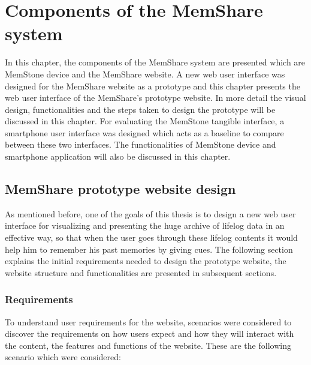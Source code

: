 \documentclass[mscthesis]{usiinfthesis}
\begin{document}
\chapter{Components of the MemShare system}
\label{sec:bot}
In this chapter, the components of the MemShare system are presented which are MemStone device and the MemShare website. A new web user interface was designed for the MemShare website as a prototype and this chapter presents the web user interface of the MemShare's prototype website. In more detail the visual design, functionalities and the steps taken to design the prototype will be discussed in this chapter. For evaluating the MemStone tangible interface, a smartphone user interface was designed which acts as a baseline to compare between these two interfaces. The functionalities of MemStone device and smartphone application will also be discussed in this chapter. 

\section{MemShare prototype website design}
\label{sec:web}
As mentioned before, one of the goals of this thesis is to design a new web user interface for visualizing and presenting the huge archive of lifelog data in an effective way, so that when the user goes through these lifelog contents it would help him to remember his past memories by giving cues. The following section explains the initial requirements needed to design the prototype website, the website structure and functionalities are presented in subsequent sections.  

\subsection{Requirements}
To understand user requirements for the website, scenarios were considered to discover the requirements on how users expect and how they will interact with the content, the features and functions of the website. These are the following scenario which were considered:
\end{document}

